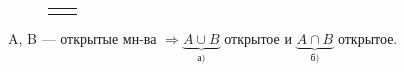 \begin{figure}[h]
	\begin{center}
	    	\begin{minipage}[h]{0.49\linewidth}
		\end{minipage}
		\hfill
		\begin{minipage}[h]{0.49\linewidth}

		\end{minipage}
		\begin{minipage}[h]{1\linewidth}
			\begin{tabular}{p{0.49\linewidth}p{0.49\linewidth}}
				\centering {$\left\{ (x,y) | x^2 + y^2 < 1 \right\}$ --- открытое} & 
				\centering {$\left\{ (x,y) | x^2 + y^2 \Le 1 \right\}$ --- не открытое} \\
			\end{tabular}
		\end{minipage}
	\end{center}
	\vspace*{-1cm}
	\caption {}
\end{figure}

\Th{} A, B --- открытые мн-ва $\Rightarrow \underbrace{A \cup B}_{\text{а)}}$ открытое и $\underbrace{A \cap B}_{\text{б)}}$ открытое.

